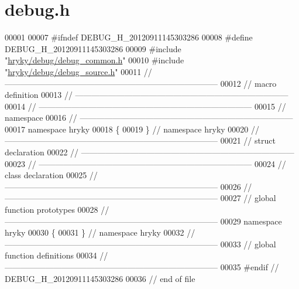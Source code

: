 \hypertarget{debug_8h_source}{\section{debug.\-h}
}

\begin{DoxyCode}
00001 
00007 \textcolor{preprocessor}{#ifndef DEBUG\_H\_20120911145303286}
00008 \textcolor{preprocessor}{}\textcolor{preprocessor}{#define DEBUG\_H\_20120911145303286}
00009 \textcolor{preprocessor}{}\textcolor{preprocessor}{#include "\hyperlink{debug__common_8h}{hryky/debug/debug_common.h}"}
00010 \textcolor{preprocessor}{#include "\hyperlink{debug__source_8h}{hryky/debug/debug_source.h}"}
00011 \textcolor{comment}{//
      ------------------------------------------------------------------------------}
00012 \textcolor{comment}{// macro definition}
00013 \textcolor{comment}{//
      ------------------------------------------------------------------------------}
00014 \textcolor{comment}{//
      ------------------------------------------------------------------------------}
00015 \textcolor{comment}{// namespace}
00016 \textcolor{comment}{//
      ------------------------------------------------------------------------------}
00017 \textcolor{keyword}{namespace }hryky
00018 \{
00019 \} \textcolor{comment}{// namespace hryky}
00020 \textcolor{comment}{//
      ------------------------------------------------------------------------------}
00021 \textcolor{comment}{// struct declaration}
00022 \textcolor{comment}{//
      ------------------------------------------------------------------------------}
00023 \textcolor{comment}{//
      ------------------------------------------------------------------------------}
00024 \textcolor{comment}{// class declaration}
00025 \textcolor{comment}{//
      ------------------------------------------------------------------------------}
00026 \textcolor{comment}{//
      ------------------------------------------------------------------------------}
00027 \textcolor{comment}{// global function prototypes}
00028 \textcolor{comment}{//
      ------------------------------------------------------------------------------}
00029 \textcolor{keyword}{namespace }hryky
00030 \{
00031 \} \textcolor{comment}{// namespace hryky}
00032 \textcolor{comment}{//
      ------------------------------------------------------------------------------}
00033 \textcolor{comment}{// global function definitions}
00034 \textcolor{comment}{//
      ------------------------------------------------------------------------------}
00035 \textcolor{preprocessor}{#endif // DEBUG\_H\_20120911145303286}
00036 \textcolor{preprocessor}{}\textcolor{comment}{// end of file}
\end{DoxyCode}
